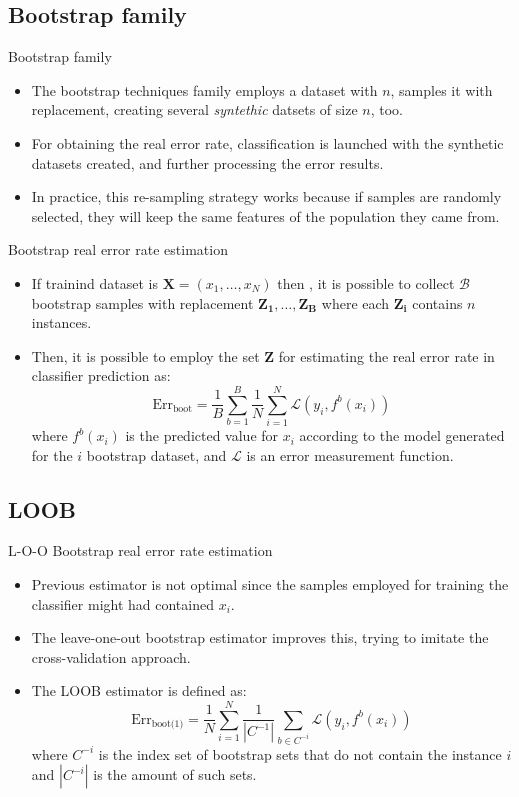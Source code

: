 \documentclass[aspectratio=169,compress,10pt]{beamer}
\begin{document}
\subsection{Bootstrap family}
\begin{frame}{Bootstrap family}
\begin{itemize}
	\item The bootstrap techniques family employs a dataset with $n$, samples it with replacement, creating several \emph{syntethic} datsets of size $n$, too.
	\item For obtaining the real error rate, classification is launched with the synthetic datasets created, and further processing the error results.
	\item In practice, this re-sampling strategy works because if samples are randomly selected, they will keep the same features of the population they came from.
\end{itemize}
\end{frame}

\begin{frame}{Bootstrap real error rate estimation}
\begin{itemize}
	\item If trainind dataset is $\mathbf{X} = (x_1,\ldots,x_N)$ then , it is possible to collect $\mathcal{B}$ bootstrap samples with replacement $\mathbf{Z_1}, \ldots, \mathbf{Z_B}$ where each $\mathbf{Z_i}$ contains $n$ instances.
	\item Then, it is possible to employ the set $\mathbf{Z}$ for estimating the real error rate in classifier prediction as:
$$
\text{Err}_{\text{boot}} = \frac{1}{B} \sum_{b=1}^{B} \frac{1}{N} \sum_{i=1}^{N} \mathcal{L}(y_i, f^b(x_i))
$$
where $f^b(x_i)$ is the predicted value for $x_i$ according to the model generated for the $i$ bootstrap dataset, and $\mathcal{L}$ is an error measurement function.
\end{itemize}
\end{frame}

\subsection{LOOB}
\begin{frame}{L-O-O Bootstrap real error rate estimation}
\begin{itemize}
	\item Previous estimator is not optimal since the samples employed for training the classifier might had contained $x_i$.
	\item The leave-one-out bootstrap estimator improves this, trying to imitate the cross-validation approach.
	\item The LOOB estimator is defined as:
	$$
	\text{Err}_{\text{boot(1)}} = \frac{1}{N} \sum_{i=1}^N \frac{1}{|C^{-1}|} \sum_{b \in C^{-i}} \mathcal{L}(y_i, f^b(x_i))
	$$
	where $C^{-i}$ is the index set of bootstrap sets that do not contain the instance $i$ and $|C^{-i}|$ is the amount of such sets. 
\end{itemize}
\end{frame}
\end{document}
